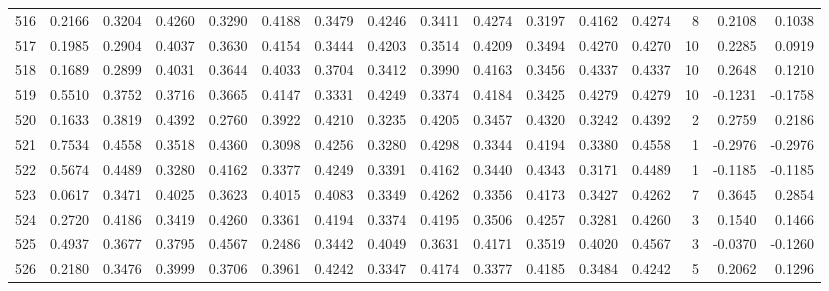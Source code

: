 \begin{tabular}{lrrrrrrrrrrrrrrr}
516 &      0.2166 &  0.3204 &  0.4260 &  0.3290 &  0.4188 &  0.3479 &  0.4246 &  0.3411 &  0.4274 &  0.3197 &   0.4162 &     0.4274 &      8 &                    0.2108 &                     0.1038 \\
517 &      0.1985 &  0.2904 &  0.4037 &  0.3630 &  0.4154 &  0.3444 &  0.4203 &  0.3514 &  0.4209 &  0.3494 &   0.4270 &     0.4270 &     10 &                    0.2285 &                     0.0919 \\
518 &      0.1689 &  0.2899 &  0.4031 &  0.3644 &  0.4033 &  0.3704 &  0.3412 &  0.3990 &  0.4163 &  0.3456 &   0.4337 &     0.4337 &     10 &                    0.2648 &                     0.1210 \\
519 &      0.5510 &  0.3752 &  0.3716 &  0.3665 &  0.4147 &  0.3331 &  0.4249 &  0.3374 &  0.4184 &  0.3425 &   0.4279 &     0.4279 &     10 &                   -0.1231 &                    -0.1758 \\
520 &      0.1633 &  0.3819 &  0.4392 &  0.2760 &  0.3922 &  0.4210 &  0.3235 &  0.4205 &  0.3457 &  0.4320 &   0.3242 &     0.4392 &      2 &                    0.2759 &                     0.2186 \\
521 &      0.7534 &  0.4558 &  0.3518 &  0.4360 &  0.3098 &  0.4256 &  0.3280 &  0.4298 &  0.3344 &  0.4194 &   0.3380 &     0.4558 &      1 &                   -0.2976 &                    -0.2976 \\
522 &      0.5674 &  0.4489 &  0.3280 &  0.4162 &  0.3377 &  0.4249 &  0.3391 &  0.4162 &  0.3440 &  0.4343 &   0.3171 &     0.4489 &      1 &                   -0.1185 &                    -0.1185 \\
523 &      0.0617 &  0.3471 &  0.4025 &  0.3623 &  0.4015 &  0.4083 &  0.3349 &  0.4262 &  0.3356 &  0.4173 &   0.3427 &     0.4262 &      7 &                    0.3645 &                     0.2854 \\
524 &      0.2720 &  0.4186 &  0.3419 &  0.4260 &  0.3361 &  0.4194 &  0.3374 &  0.4195 &  0.3506 &  0.4257 &   0.3281 &     0.4260 &      3 &                    0.1540 &                     0.1466 \\
525 &      0.4937 &  0.3677 &  0.3795 &  0.4567 &  0.2486 &  0.3442 &  0.4049 &  0.3631 &  0.4171 &  0.3519 &   0.4020 &     0.4567 &      3 &                   -0.0370 &                    -0.1260 \\
526 &      0.2180 &  0.3476 &  0.3999 &  0.3706 &  0.3961 &  0.4242 &  0.3347 &  0.4174 &  0.3377 &  0.4185 &   0.3484 &     0.4242 &      5 &                    0.2062 &                     0.1296 \\

\end{tabular}
